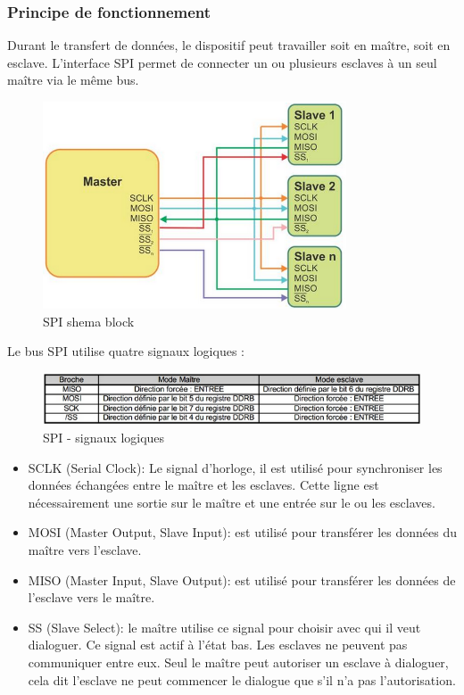 \documentclass[french,a4paper,12pt]{report}
\begin{document}
			\subsubsection{Principe de fonctionnement}
			
			Durant le transfert de données, le dispositif peut travailler soit en maître, soit en esclave. L'interface SPI permet de connecter un ou plusieurs esclaves à un seul maître via le même bus.
			
	\begin{figure}[!ht]
    \center
  	\includegraphics[width=9cm]{SPI1.png}
    \caption{SPI shema block}
	\end{figure}	
 
 
	Le bus SPI utilise quatre signaux logiques :
 
	\begin{figure}[!ht]
    \center
  	\includegraphics[width=14cm]{SPI2.png}
    \caption{SPI - signaux logiques}
	\end{figure}	
 
	\begin{itemize}
	\item SCLK (Serial Clock): Le signal d'horloge, il est utilisé pour synchroniser les données échangées entre le maître et 	les esclaves. Cette ligne est nécessairement une sortie sur le maître et une entrée sur le ou les esclaves.
 
	\item MOSI (Master Output, Slave Input): est utilisé pour transférer les données du maître vers l'esclave.
 
	\item MISO (Master Input, Slave Output): est utilisé pour transférer les données de l'esclave vers le maître.
 
	\item SS (Slave Select): le maître utilise ce signal pour choisir avec qui il veut dialoguer. Ce signal est actif à l'état bas. Les esclaves ne peuvent pas communiquer entre eux. Seul le maître peut autoriser un esclave à dialoguer, cela dit l'esclave ne peut commencer le dialogue que s'il n'a pas l'autorisation.
\end{itemize}
 
\end{document}
